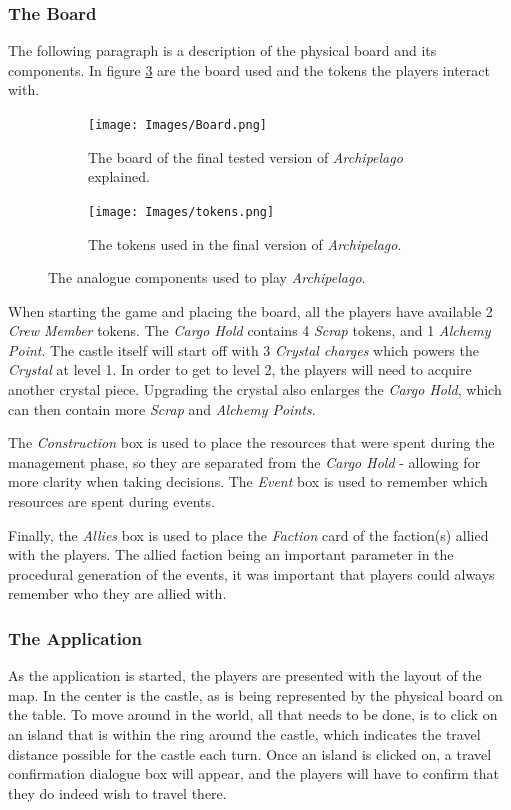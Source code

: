 \subsubsection{The Board}
The following paragraph is a description of the physical board and its components. In figure \ref{fig:compo} are the board used and the tokens the players interact with.
\begin{figure}[!ht]
   \centering
   \begin{subfigure}[b]{\textwidth}
       \texttt{[image: Images/Board.png]}
       \caption{The board of the final tested version of \textit{Archipelago} explained.}
       \label{fig:boardfinal}
   \end{subfigure}
   \begin{subfigure}[b]{\textwidth}
   \centering
       \texttt{[image: Images/tokens.png]}
       \caption{The tokens used in the final version of \textit{Archipelago}.}
       \label{fig:tokens}
   \end{subfigure}
   \caption{The analogue components used to play \textit{Archipelago}.}
   \label{fig:compo}
\end{figure}

When starting the game and placing the board, all the players have available 2 \textit{Crew Member} tokens. The \textit{Cargo Hold} contains 4 \textit{Scrap} tokens, and 1 \textit{Alchemy Point}. The castle itself will start off with 3 \textit{Crystal charges} which powers the \textit{Crystal} at level 1. In order to get to level 2, the players will need to acquire another crystal piece. Upgrading the crystal also enlarges the \textit{Cargo Hold}, which can then contain more \textit{Scrap} and \textit{Alchemy Points}.

The \textit{Construction} box is used to place the resources that were spent during the management phase, so they are separated from the \textit{Cargo Hold} - allowing for more clarity when taking decisions. The \textit{Event} box is used to remember which resources are spent during events. 

Finally, the \textit{Allies} box is used to place the \textit{Faction} card of the faction(s) allied with the players. The allied faction being an important parameter in the procedural generation of the events, it was important that players could always remember who they are allied with. 
\subsubsection{The Application}
As the application is started, the players are presented with the layout of the map. In the center is the castle, as is being represented by the physical board on the table. To move around in the world, all that needs to be done, is to click on an island that is within the ring around the castle, which indicates the travel distance possible for the castle each turn. Once an island is clicked on, a travel confirmation dialogue box will appear, and the players will have to confirm that they do indeed wish to travel there.
